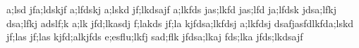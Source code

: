 a;lsd jfa;ldskjf a;lfdskj a;lskd jf;lkdsajf
a;lkfds jas;lkfd jas;lfd ja;lfdsk jdsa;lfkj
dsa;lfkj adslf;k a;lk jfd;lkasdj f;lakds jf;la
kjfdsa;lkfdsj a;lkfdsj dsafjasfdlkfda;lskd jf;las jf;las
kjfd;alkjfds e;esflu;lkfj sad;flk jfdsa;lkaj
fds;lka jfds;lkdsajf
